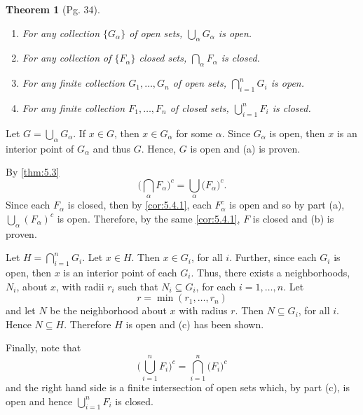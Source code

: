 \documentclass[leqno]{article}
\makeatletter
\newtheorem{theorem}{Theorem}[section]
\theoremstyle{definition}
\theoremstyle{remark}
\let\oldproofname=\proofname
\renewcommand{\proofname}{\bf{\textit{\oldproofname}}}
\renewenvironment{proof}[1][\proofname]{\par
  \pushQED{\qed}%
  \normalfont \topsep6\p@\@plus6\p@\relax
  \list{}{\leftmargin=0mm
          \rightmargin=0mm
          \settowidth{\itemindent}{\itshape#1}%
          \labelwidth=4mm
          \parsep=0pt \listparindent=0mm%
  }
  \item[\hskip\labelsep
        \itshape
    #1\@addpunct{.}]\ignorespaces
}{%
  \popQED\endlist\@endpefalse
}
\makeatother
\begin{document}
            \begin{theorem}[Pg. 34]\label{thm:5.5}\hfill\par
                \begin{enumerate}[label=\normalfont{(\alph*)}]
                    \item For any collection $\{G_{\alpha}\}$ of open sets, $\bigcup_{\alpha}G_{\alpha}$ is open.
                    \item For any collection of $\{F_{\alpha}\}$ closed sets, $\bigcap_{\alpha} F_{\alpha}$ is closed.
                    \item For any finite collection $G_1,\dots,G_n$ of open sets, $\bigcap_{i=1}^n G_i$ is open.
                    \item For any finite collection $F_1,\dots, F_n$ of closed sets, $\bigcup_{i=1}^n F_i$ is closed. 
                \end{enumerate}
            \end{theorem}
                \begin{proof}
                    Let $G=\bigcup_{\alpha} G_{\alpha}$. If $x\in G$, then $x\in G_{\alpha}$ for some $\alpha$. Since $G_{\alpha}$ is open, then $x$ is an interior point of $G_{\alpha}$ and thus $G$. Hence, $G$ is open and (a) is proven.\par\hspace{4mm} By \cref{thm:5.3}
                        \begin{equation*}
                            \bigg(\bigcap_{\alpha}F_{\alpha}\bigg)^c=\bigcup_{\alpha}\big(F_{\alpha}\big)^c.
                        \end{equation*}
                    Since each $F_{\alpha}$ is closed, then by \cref{cor:5.4.1}, each $F_{\alpha}^c$ is open and so by part (a), $\bigcup_{\alpha}(F_{\alpha})^c$ is open. Therefore, by the same \cref{cor:5.4.1}, $F$ is closed and (b) is proven.\par\hspace{4mm} Let $H=\bigcap_{i=1}^n G_i$. Let $x\in H$. Then $x\in G_i$, for all $i$. Further, since each $G_i$ is open, then $x$ is an interior point of each $G_i$. Thus, there exists a neighborhoods, $N_i$, about $x$, with radii $r_i$ such that $N_i\subseteq G_i$, for each $i=1,\dots,n$. Let 
                        \begin{equation*}
                            r=\min(r_1,\dots,r_n)
                        \end{equation*}
                    and let $N$ be the neighborhood about $x$ with radius $r$. Then $N\subseteq G_i$, for all $i$. Hence $N\subseteq H$. Therefore $H$ is open and (c) has been shown.\par\hspace{4mm} Finally, note that 
                        \begin{equation*}
                            \bigg(\bigcup_{i=1}^n F_i\bigg)^c=\bigcap_{i=1}^n\big(F_i\big)^c
                        \end{equation*}
                    and the right hand side is a finite intersection of open sets which, by part (c), is open and hence $\bigcup_{i=1}^n F_i$ is closed.
                \end{proof}\newpage
\end{document}
